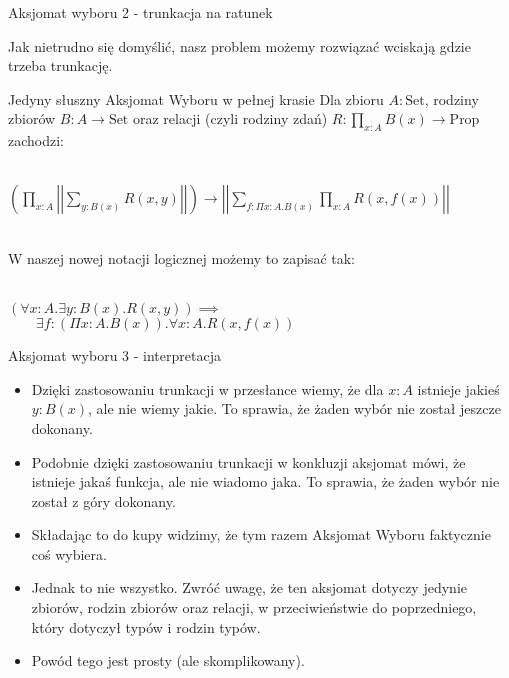 \documentclass{beamer}
\newcommand{\Prop}{\text{Prop}}
\newcommand{\Set}{\text{Set}}
\begin{document}
\begin{frame}{Aksjomat wyboru 2 - trunkacja na ratunek}

Jak nietrudno się domyślić, nasz problem możemy rozwiązać wciskają gdzie trzeba trunkację.

\begin{block}{Jedyny słuszny Aksjomat Wyboru w pełnej krasie}
Dla zbioru $A : \Set$, rodziny zbiorów $B : A \to \Set$ oraz relacji (czyli rodziny zdań) $R : \prod_{x : A} B(x) \to \Prop$ zachodzi: \\~\

$\displaystyle
	\left(\prod_{x : A} \left|\left|\sum_{y : B(x)} R(x, y)\right|\right|\right) \to
	\left|\left|\sum_{f : \Pi x : A. B(x)} \prod_{x : A} R(x, f(x))\right|\right|
$ \\~\

W naszej nowej notacji logicznej możemy to zapisać tak: \\~\

$\displaystyle
	(\forall x : A. \exists y : B(x). R(x, y)) \implies
$ \\
$\displaystyle \qquad
	\exists f : (\Pi x : A. B(x)). \forall x : A. R(x, f(x))
$
\end{block}

\end{frame}

\begin{frame}{Aksjomat wyboru 3 - interpretacja}
\begin{itemize}
	\item Dzięki zastosowaniu trunkacji w przesłance wiemy, że dla $x : A$ istnieje jakieś $y : B(x)$, ale nie wiemy jakie. To sprawia, że żaden wybór nie został jeszcze dokonany.
	\item Podobnie dzięki zastosowaniu trunkacji w konkluzji aksjomat mówi, że istnieje jakaś funkcja, ale nie wiadomo jaka. To sprawia, że żaden wybór nie został z góry dokonany.
	\item Składając to do kupy widzimy, że tym razem Aksjomat Wyboru faktycznie coś wybiera.
	\item Jednak to nie wszystko. Zwróć uwagę, że ten aksjomat dotyczy jedynie zbiorów, rodzin zbiorów oraz relacji, w przeciwieństwie do poprzedniego, który dotyczył typów i rodzin typów.
	\item Powód tego jest prosty (ale skomplikowany).
\end{itemize}
\end{frame}
\end{document}
